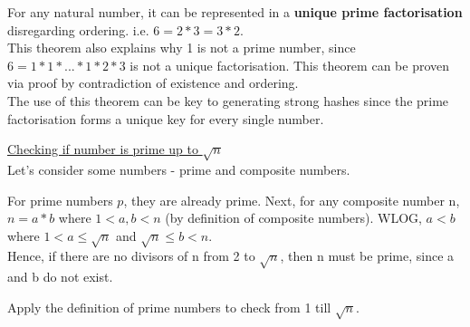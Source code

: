 \documentclass[12pt]{article}
\begin{document}
For any natural number, it can be represented in a {\textbf{unique prime factorisation}} disregarding ordering. 
i.e. \(6 = 2 * 3 = 3 * 2\). \\[\baselineskip]
This theorem also explains why 1 is not a prime number, since \(6 = 1 * 1 * ... * 1 * 2 * 3\) is not a unique factorisation. 
This theorem can be proven via proof by contradiction of existence and ordering. \\ [\baselineskip]

The use of this theorem can be key to generating strong hashes since the prime factorisation forms a unique key for every single number. \\ [\baselineskip]

\pagebreak

{\underline{Checking if number is prime up to \(\sqrt{n}\)}} \\ [\baselineskip]
Let's consider some numbers - prime and composite numbers. 

For prime numbers \(p\), they are already prime. 
Next, for any composite number n, \(n = a * b\) where \(1 < a, b < n\) (by definition of composite numbers). 
WLOG, \(a < b\) where \(1 < a \leq \sqrt{n} \) and \(\sqrt{n} \leq b < n\). \\ [\baselineskip]

Hence, if there are no divisors of n from 2 to \(\sqrt{n}\), then n must be prime, since a and b do not exist.

Apply the definition of prime numbers to check from 1 till \(\sqrt{n}\).
\end{document}
